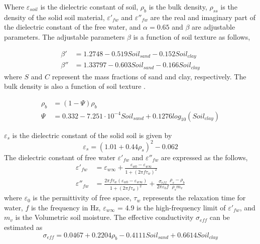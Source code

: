 \documentclass[draftcls,onecolumn]{IEEEtran}  %
\begin{document}
Where $\varepsilon_{soil}$ is the dielectric constant of soil, $\rho_b$ is the bulk density, $\rho_{ss}$ is the density of the solid soil material, $\varepsilon'_{fw}$ and $\varepsilon''_{fw}$ are the real and imaginary part of the dielectric constant of the free water, and $\alpha=0.65$ and $\beta$ are adjustable parameters. The adjustable parameters $\beta$ is a function of soil texture as follows,

\begin{equation}
\begin{split}
	\beta' &= 1.2748-0.519Soil_{sand}-0.152Soil_{clay} \\
    \beta'' &=1.33797-0.603Soil_{sand}-0.166Soil_{clay}
 \end{split}
\end{equation}
where $S$ and $C$ represent the mass fractions of sand and clay, respectively. The bulk density is also a function of soil texture \cite{Saxton:1986}.

\begin{equation} \label{eq: bulk_density}
\begin{split}
	 \rho_b &= (1-\Psi)\rho_b \\
	  \Psi &= 0.332 - 7.251 \cdot 10^{-4} Soil_{sand} + 0.1276 log_{10}(Soil_{clay})
\end{split}
\end{equation}

$\varepsilon_{s} $ is the dielectric constant of the solid soil is given by
\begin{equation}
	\varepsilon_s = (1.01+0.44\rho_s)^2-0.062
\end{equation}
The dielectric constant of free water $\varepsilon'_{fw}$ and $\varepsilon''_{fw}$ are expressed as the follows,
\begin{equation}
\begin{split}
	\varepsilon'_{fw} &=\varepsilon_{w\infty} + \frac{\varepsilon_{w0}-\varepsilon_{w\infty}}{1+(2 \pi f \tau_w)^2} \\
    \varepsilon''_{fw} &=\frac{2 \pi f \tau_w(\varepsilon_{w0}-\varepsilon_{w\infty})}{1+(2 \pi f \tau_w)^2} + \frac{\sigma_{eff}}{2 \pi \varepsilon_0 f} \frac{\rho_s-\rho_b}{\rho_s m_v} 
\end{split}
\end{equation}
where $\varepsilon_0$ is the permittivity of free space, $\tau_w$ represents the relaxation time for water, $f$ is the frequency in Hz, $\varepsilon_{w\infty}$ = 4.9 is the high-frequency limit of $\varepsilon'_{fw}$, and $m_v$ is the Volumetric soil moisture. The effective conductivity $\sigma_{eff}$ can be estimated as
\begin{equation}
	\sigma_{eff} = 0.0467+0.2204\rho_b-0.4111Soil_{sand}+0.6614Soil_{clay}
\end{equation}
\end{document}
